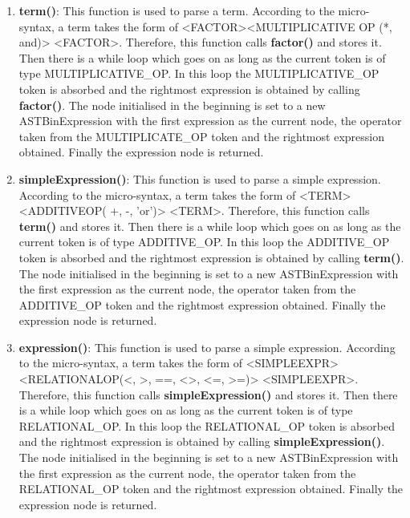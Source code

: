 \documentclass{article}
\begin{document}
\begin{enumerate}
				\item \textbf{term()}: This function is used to parse a term. According to the micro-syntax, a term takes the form of \textless FACTOR\textgreater {\textless MULTIPLICATIVE OP (*, \, and)\textgreater} \textless FACTOR\textgreater. Therefore, this function calls \textbf{factor()} and stores it. Then there is a while loop which goes on as long as the current token is of type MULTIPLICATIVE\_OP. In this loop the MULTIPLICATIVE\_OP token is absorbed and the rightmost expression is obtained by calling \textbf{factor()}. The node initialised in the beginning is set to a new ASTBinExpression with the first expression as the current node, the operator taken from the MULTIPLICATE\_OP token and the rightmost expression obtained. Finally the expression node is returned.
				
					\item \textbf{simpleExpression()}: This function is used to parse a simple expression. According to the micro-syntax, a term takes the form of \textless TERM\textgreater {\textless ADDITIVEOP( +, -, 'or')\textgreater} \textless TERM\textgreater. Therefore, this function calls \textbf{term()} and stores it. Then there is a while loop which goes on as long as the current token is of type ADDITIVE\_OP. In this loop the ADDITIVE\_OP token is absorbed and the rightmost expression is obtained by calling \textbf{term()}. The node initialised in the beginning is set to a new ASTBinExpression with the first expression as the current node, the operator taken from the ADDITIVE\_OP token and the rightmost expression obtained. Finally the expression node is returned.
			
						\item \textbf{expression()}: This function is used to parse a simple expression. According to the micro-syntax, a term takes the form of \textless SIMPLEEXPR\textgreater {\textless RELATIONALOP(<, >, ==, <>, <=, >=)\textgreater} \textless SIMPLEEXPR\textgreater. Therefore, this function calls \textbf{simpleExpression()} and stores it. Then there is a while loop which goes on as long as the current token is of type RELATIONAL\_OP. In this loop the RELATIONAL\_OP token is absorbed and the rightmost expression is obtained by calling \textbf{simpleExpression()}. The node initialised in the beginning is set to a new ASTBinExpression with the first expression as the current node, the operator taken from the RELATIONAL\_OP token and the rightmost expression obtained. Finally the expression node is returned.
			

\end{enumerate}
\end{document}
